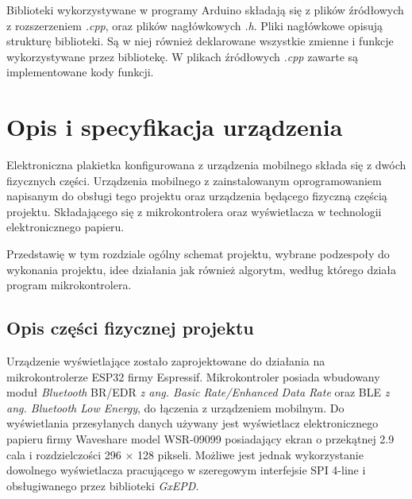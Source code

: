 \documentclass[a4paper,12pt, twoside]{article}
\begin{document}
    	\vspace{1cm}
        Biblioteki wykorzystywane w programy Arduino składają się z plików źródłowych z rozszerzeniem \textit{.cpp}, oraz plików nagłówkowych \textit{.h}. Pliki nagłówkowe opisują strukturę biblioteki. Są w niej również deklarowane wszystkie zmienne i funkcje wykorzystywane przez bibliotekę. W plikach źródłowych \textit{.cpp} zawarte są implementowane kody funkcji.
        
        \vspace{1cm}
    	\section{Opis i specyfikacja urządzenia}
    	Elektroniczna plakietka konfigurowana z urządzenia mobilnego składa się z dwóch fizycznych części. Urządzenia mobilnego z zainstalowanym oprogramowaniem napisanym do obsługi tego projektu oraz urządzenia będącego fizyczną częścią projektu. Składającego się z mikrokontrolera oraz wyświetlacza w technologii elektronicznego papieru.
    
        Przedstawię w tym rozdziale ogólny schemat projektu, wybrane podzespoły do wykonania projektu, idee działania jak również algorytm, według którego działa program mikrokontrolera.
        \vspace{.5cm}
        \subsection{Opis części fizycznej projektu}
        Urządzenie wyświetlające zostało zaprojektowane do działania na mikrokontrolerze ESP32 firmy Espressif. Mikrokontroler posiada wbudowany moduł \textit{Bluetooth} BR/EDR \textit{z ang. Basic Rate/Enhanced Data Rate}\cite{edr} oraz BLE \textit{z ang. Bluetooth Low Energy}\cite{ble}, do łączenia z urządzeniem mobilnym. Do wyświetlania przesyłanych danych używany jest wyświetlacz elektronicznego papieru firmy Waveshare model WSR-09099 posiadający ekran o przekątnej 2.9 cala i rozdzielczości 296 × 128 pikseli. Możliwe jest jednak wykorzystanie dowolnego wyświetlacza 
        pracującego w szeregowym interfejsie SPI 4-line i obsługiwanego przez biblioteki \textit{GxEPD}\cite{gxepd}.
        \vspace{.5cm}
\end{document}
